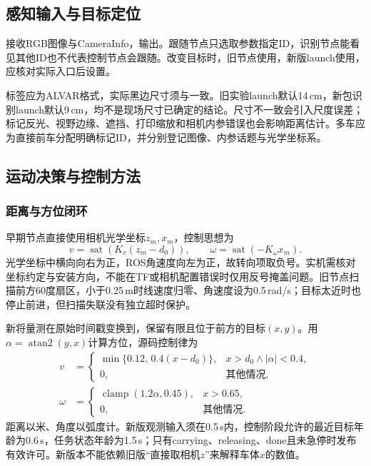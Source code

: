 \subsection{感知输入与目标定位}
接收RGB图像与CameraInfo，输出。跟随节点只选取参数指定ID，识别节点能看见其他ID也不代表控制节点会跟随。改变目标时，旧节点使用，新版launch使用，应核对实际入口后设置。

标签应为ALVAR格式，实际黑边尺寸须与一致。旧实验launch默认14\,cm，新包识别launch默认9\,cm，均不是现场尺寸已确定的结论。尺寸不一致会引入尺度误差；标记反光、视野边缘、遮挡、打印缩放和相机内参错误也会影响距离估计。多车应为直接前车分配明确标记ID，并分别登记图像、内参话题与光学坐标系。

\subsection{运动决策与控制方法}
\subsubsection{距离与方位闭环}
早期节点直接使用相机光学坐标$z_m,x_m$，控制思想为
\begin{equation}
v=\operatorname{sat}\!\left(K_v(z_m-d_0)\right),\qquad
\omega=\operatorname{sat}\!\left(-K_\omega x_m\right).
\end{equation}
光学坐标中横向向右为正，ROS角速度向左为正，故转向项取负号。实机需核对坐标约定与安装方向，不能在TF或相机配置错误时仅用反号掩盖问题。旧节点扫描前方60度扇区，小于0.25\,m时线速度归零、角速度设为0.5\,rad/s；目标太近时也停止前进，但扫描失联没有独立超时保护。

新将量测在原始时间戳变换到，保留有限且位于前方的目标$(x,y)$。用$\alpha=\operatorname{atan2}(y,x)$计算方位，源码控制律为
\begin{align}
v&=\begin{cases}\min\{0.12,\,0.4(x-d_0)\},&x>d_0\land|\alpha|<0.4,\\0,&\text{其他情况},\end{cases}\\
\omega&=\begin{cases}\operatorname{clamp}(1.2\alpha,0.45),&x>0.65,\\0,&\text{其他情况}.\end{cases}
\end{align}
距离以米、角度以弧度计。新版观测输入须在0.5\,s内，控制阶段允许的最近目标年龄为0.6\,s，任务状态年龄为1.5\,s；只有carrying、releasing、done且未急停时发布有效许可。新版本不能依赖旧版“直接取相机$z$”来解释车体$x$的数值。
